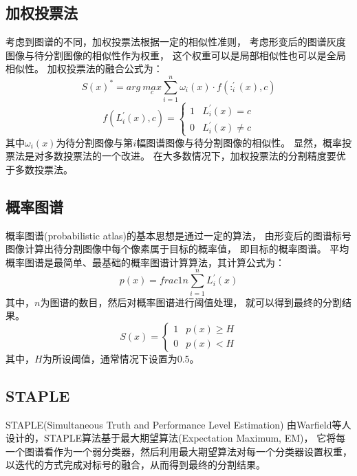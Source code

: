 \subsection{加权投票法}
考虑到图谱的不同，加权投票法根据一定的相似性准则，
考虑形变后的图谱灰度图像与待分割图像的相似性作为权重，
这个权重可以是局部相似性也可以是全局相似性。
加权投票法的融合公式为：
\begin{equation}
  S(x)^\ast=arg\ \underset{c}{max}\sum_{i=1}^n\omega_i(x)\cdot
  f(:_i^\prime(x),c)
\end{equation}
\begin{equation}
  f(L_i^\prime(x),c)=
  \begin{cases}
    1& L_i^\prime(x)=c\\
    0& L_i^\prime(x)\ne c
  \end{cases}
\end{equation}
其中$\omega_i(x)$为待分割图像与第$i$幅图谱图像与待分割图像的相似性。
显然，概率投票法是对多数投票法的一个改进。
在大多数情况下，加权投票法的分割精度要优于多数投票法。

\subsection{概率图谱}
概率图谱(probabilistic atlas)的基本思想是通过一定的算法，
由形变后的图谱标号图像计算出待分割图像中每个像素属于目标的概率值，
即目标的概率图谱。
平均概率图谱是最简单、最基础的概率图谱计算算法，其计算公式为：
\begin{equation}
  p(x)=frac{1}{n}\sum_{i=1}^{n}L_i^\prime(x)
\end{equation}
其中，$n$为图谱的数目，然后对概率图谱进行阈值处理，
就可以得到最终的分割结果。
\begin{equation}
  S(x)=
  \begin{cases}
    1& p(x)\ge H\\
    0& p(x)<H
  \end{cases}
\end{equation}
其中，$H$为所设阈值，通常情况下设置为$0.5$。

\subsection{STAPLE}
STAPLE(Simultaneous Truth and Performance Level Estimation)
由Warfield等人设计的，STAPLE算法基于最大期望算法(Expectation Maximum, EM)，
它将每一个图谱看作为一个弱分类器，然后利用最大期望算法对每一个分类器设置权重，
以迭代的方式完成对标号的融合，从而得到最终的分割结果。

